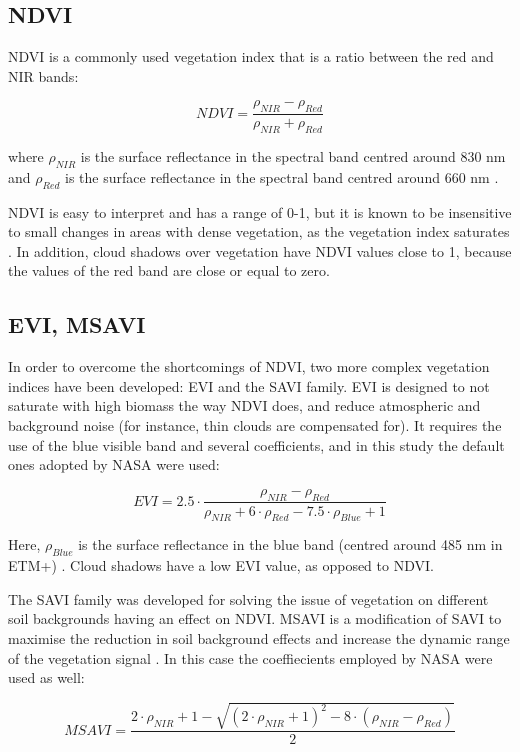 \documentclass[a4paper,12pt]{scrbook}
\begin{document}
\subsection{NDVI}

\ac{NDVI} is a commonly used vegetation index that is a ratio between the red and \ac{NIR} bands:

$$ NDVI = \frac{\rho_{NIR} - \rho_{Red}}{\rho_{NIR} + \rho_{Red}} $$

where $\rho_{NIR}$ is the surface reflectance in the spectral band centred around 830 nm and $\rho_{Red}$ is the surface reflectance in the spectral band centred around 660 nm \citep{tucker_monitoring_1979}.

\ac{NDVI} is easy to interpret and has a range of 0-1, but it is known to be insensitive to small changes in areas with dense vegetation, as the vegetation index saturates \citep{huete_modis_1999}. In addition, cloud shadows over vegetation have \ac{NDVI} values close to 1, because the values of the red band are close or equal to zero.

\subsection{EVI, MSAVI}

In order to overcome the shortcomings of \ac{NDVI}, two more complex vegetation indices have been developed: \ac{EVI} and the \ac{SAVI} family. \ac{EVI} is designed to not saturate with high biomass the way NDVI does, and reduce atmospheric and background noise (for instance, thin clouds are compensated for). It requires the use of the blue visible band and several coefficients, and in this study the default ones adopted by NASA were used:

$$ EVI = 2.5 \cdot \frac{\rho_{NIR} - \rho_{Red}}{\rho_{NIR}+6 \cdot \rho_{Red} - 7.5 \cdot \rho_{Blue} + 1} $$

Here, $\rho_{Blue}$ is the surface reflectance in the blue band (centred around 485 nm in \ac{ETM+}) \citep{huete_modis_1999}. Cloud shadows have a low EVI value, as opposed to NDVI.

The \ac{SAVI} family was developed for solving the issue of vegetation on different soil backgrounds having an effect on NDVI. \ac{MSAVI} is a modification of \ac{SAVI} to maximise the reduction in soil background effects and increase the dynamic range of the vegetation signal \citep{qi_modified_1994}. In this case the coeffiecients employed by NASA were used as well:

$$ MSAVI = \frac{2 \cdot \rho_{NIR} + 1 - \sqrt{(2 \cdot \rho_{NIR} + 1)^2 - 8 \cdot (\rho_{NIR} - \rho_{Red})}}{2} $$
\end{document}
